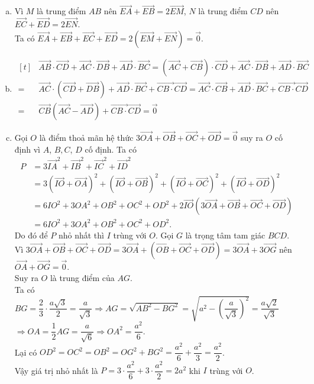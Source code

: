 \begin{ex}
\begin{ex}
{\begin{enumerate}[a)]
			\item Vì $M$ là trung điểm $AB$ nên $\vec{EA}+\vec{EB}=2\vec{EM}$, $N$ là trung điểm $CD$ nên $\vec{EC}+\vec{ED}=2\vec{EN}$.\\
			Ta có $\vec{EA}+\vec{EB}+\vec{EC}+\vec{ED}=2\left(\vec{EM}+\vec{EN}\right)=\vec{0}$.
			\item $\begin{aligned}[t]
				&\vec{AB} \cdot \vec{CD}+\vec{AC} \cdot \vec{DB}+\vec{AD} \cdot \vec{BC}=\left(\vec{AC}+\vec{CB}\right) \cdot \vec{CD}+\vec{AC} \cdot \vec{DB}+\vec{AD} \cdot \vec{BC}\\
				 = & \vec{AC} \cdot \left(\vec{CD}+\vec{DB}\right)+\vec{AD} \cdot \vec{BC}+\vec{CB \cdot }\vec{CD}=\vec{AC} \cdot \vec{CB}+\vec{AD} \cdot \vec{BC}+\vec{CB \cdot }\vec{CD} \\
				 = &\vec{CB}\left(\vec{AC}-\vec{AD}\right)+\vec{CB \cdot }\vec{CD}=\vec{0} 
				\end{aligned}$
			\item Gọi $O$ là điểm thoả mãn hệ thức $3\vec{OA}+\vec{OB}+\vec{OC}+\vec{OD}=\vec{0}$ suy ra $O$ cố định vì $A$, $B,C$, $D$ cố định. Ta có
			\begin{align*}
				P& =3\vec{IA}^2+\vec{IB}^2+\vec{IC}^2+\vec{ID}^2 \\
				& =3\left(\vec{IO}+\vec{OA}\right)^2+\left(\vec{IO}+\vec{OB}\right)^2+\left(\vec{IO}+\vec{OC}\right)^2+\left(\vec{IO}+\vec{OD}\right)^2 \\
				& =6IO^2+3OA^2+OB^2+OC^2+OD^2+2\vec{IO}\left(3\vec{OA}+\vec{OB}+\vec{OC}+\vec{OD}\right) \\
				& =6IO^2+3OA^2+OB^2+OC^2+OD^2.
			\end{align*}
			Do đó để $P$ nhỏ nhất thì $I$ trùng với $O$. Gọi $G$ là trọng tâm tam giác $BCD$.\\
			Vì $3\vec{OA}+\vec{OB}+\vec{OC}+\vec{OD}=3\vec{OA}+\left(\vec{OB}+\vec{OC}+\vec{OD}\right) =3\vec{OA}+3\vec{OG}$ nên $\vec{OA}+\vec{OG}=\vec{0}$.\\			
			Suy ra $O$ là trung điểm của $AG$.\\
			Ta có $BG=\dfrac{2}{3} \cdot \dfrac{a\sqrt{3}}{2}=\dfrac{a}{\sqrt{3}}\Rightarrow AG=\sqrt{AB^2-BG^2}=\sqrt{a^2-{{\left(\dfrac{a}{\sqrt{3}}\right)}^2}}=\dfrac{a\sqrt{2}}{\sqrt{3}}$\\
			$\Rightarrow OA=\dfrac{1}{2}AG=\dfrac{a}{\sqrt{6}}\Rightarrow OA^2=\dfrac{a^2}{6}$.\\
			Lại có $OD^2=OC^2=OB^2=OG^2+BG^2=\dfrac{a^2}{6}+\dfrac{a^2}{3}=\dfrac{a^2}{2}$.\\
			Vậy giá trị nhỏ nhất là $P=3 \cdot \dfrac{a^2}{6}+3 \cdot \dfrac{a^2}{2}=2a^2$ khi $I$ trùng với $O$.
		\end{enumerate}
		
}
\end{ex}
\end{ex}
